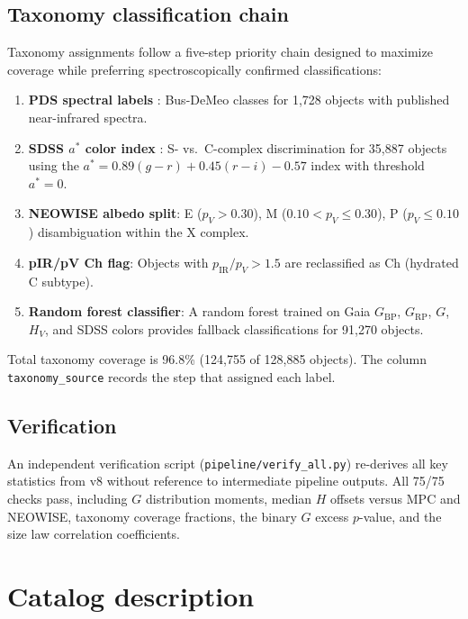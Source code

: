 \documentclass{aa}
\begin{document}
\subsection{Taxonomy classification chain}
\label{sec:taxonomy}

Taxonomy assignments follow a five-step priority chain designed to maximize
coverage while preferring spectroscopically confirmed classifications:

\begin{enumerate}
\item \textbf{PDS spectral labels} \citep{demeo2009}: Bus-DeMeo classes for
      1,728 objects with published near-infrared spectra.
\item \textbf{SDSS $a^*$ color index} \citep{ivezic2001}: S- vs.\ C-complex
      discrimination for 35,887 objects using the $a^* = 0.89(g-r) +
      0.45(r-i) - 0.57$ index with threshold $a^* = 0$.
\item \textbf{NEOWISE albedo split}: E ($p_V > 0.30$), M ($0.10 < p_V
      \leq 0.30$), P ($p_V \leq 0.10$) disambiguation within the X complex.
\item \textbf{pIR/pV Ch flag}: Objects with $p_\mathrm{IR}/p_V > 1.5$
      are reclassified as Ch (hydrated C subtype).
\item \textbf{Random forest classifier}: A random forest trained on Gaia
      $G_\mathrm{BP}$, $G_\mathrm{RP}$, $G$, $H_V$, and SDSS colors
      provides fallback classifications for 91,270 objects.
\end{enumerate}

Total taxonomy coverage is 96.8\% (124,755 of 128,885 objects).  The
column \texttt{taxonomy\_source} records the step that assigned each label.

\subsection{Verification}
\label{sec:verification}

An independent verification script (\texttt{pipeline/verify\_all.py})
re-derives all key statistics from v8 without reference to intermediate
pipeline outputs.  All 75/75 checks pass, including $G$ distribution
moments, median $H$ offsets versus MPC and NEOWISE, taxonomy coverage
fractions, the binary $G$ excess $p$-value, and the size law correlation
coefficients.


\section{Catalog description}
\label{sec:catalog}
\end{document}
